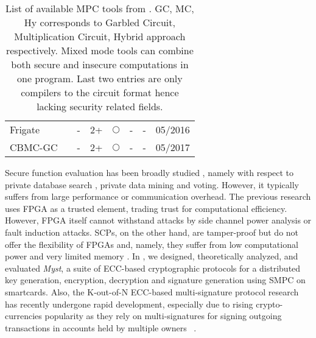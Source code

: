 \documentclass[
  digital, %
  twoside, %
  table,   %
  lof,     %
  lot,     %
]{fithesis3}
\begin{document}
\begin{table}[h]
\begin{tabular}{llllllll}
Frigate \cite{MGCBT16}    &  & -        & 2+ & $\Circle$     & -           & -         & 05/2016           \\
CBMC-GC \cite{HFKV12}    &  & -        & 2+ & $\Circle$     & -           & -         & 05/2017           \\
\end{tabular}
\caption{List of available MPC tools from \cite{sok19}. GC, MC, Hy corresponds to Garbled Circuit, Multiplication Circuit, Hybrid approach respectively. Mixed mode tools can combine both secure and insecure computations in one program. Last two entries are only compilers to the circuit format hence lacking security related fields.}
\label{tbl:compilers}
\end{table}


\begin{ecmmnt}
Secure function evaluation has been broadly studied \cite{
yao82, conf/sp/SonghoriHS0K15, Malkhi:2004:FST:1251375.1251395, 10.1007/978-3-642-40041-4_5}, namely with respect to private database search \cite{Bertino2005, Naor:1999:PPA:336992.337028}, private data mining \cite{Aldeen2015} and voting. However, it typically suffers from large performance or communication overhead.
The previous research uses FPGA as a trusted element, trading trust for computational efficiency. However, FPGA itself cannot withstand attacks by side channel power analysis or fault induction attacks.
SCPs, on the other hand, are tamper-proof but do not offer the flexibility of FPGAs and, namely, they suffer from low computational power and very limited memory \cite{10.1007/978-3-642-19074-2_1, Boureanu:2015:LCC:2714576.2714591, cryptoeprint:2016:615}.
In \cite{2017-ccs-mavroudis}, we designed, theoretically analyzed, and evaluated \emph{Myst}, a suite of ECC-based cryptographic protocols for a distributed key generation, encryption, decryption and signature generation using SMPC on smartcards.
Also, the K-out-of-N ECC-based multi-signature protocol research has recently undergone rapid development, especially due to rising crypto-currencies popularity as they rely on multi-signatures for signing outgoing transactions in accounts held by multiple owners ~\cite{Bellare:2007:UAS:2394539.2394589, Bnz2017BulletproofsSP, cryptoeprint:2018:068}. 
\end{ecmmnt}

\end{document}
